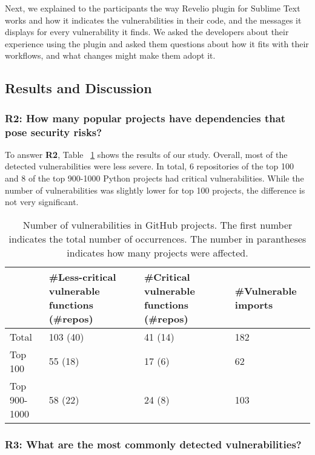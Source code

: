 Next, we explained to the participants the way Revelio plugin for Sublime Text works and how it indicates the vulnerabilities in their code, and the messages it displays for every vulnerability it finds. We asked the developers about their experience using the plugin and asked them questions about how it fits with their workflows, and what changes might make them adopt it.

\subsection{Results and Discussion}

\subsubsection{R2: How many popular projects have dependencies that pose security risks?}

To answer \textbf{R2}, Table ~\ref{tab:vuln} shows the results of our study. Overall, most of the detected vulnerabilities were less severe. In total, 6 repositories of the top 100 and 8 of the top 900-1000 Python projects had critical vulnerabilities. While the number of vulnerabilities was slightly lower for top 100 projects, the difference is not very significant.

\begin{table}[!h]
\small
  \centering
  \begin{tabular}{|p{}|p{}|p{}|p{}|}
    \hline
 & \#Less-critical vulnerable functions (\#repos)& \#Critical vulnerable functions (\#repos) & \#Vulnerable imports \\
\hline
\hline
Total & 103 (40) & 41 (14) & 182  \\
\hline
Top 100 & 55 (18) & 17 (6) & 62 \\
\hline
Top 900-1000 & 58 (22) & 24 (8) & 103  \\
 \hline
  \end{tabular}
  \caption{Number of vulnerabilities in GitHub projects. The first number indicates the total number of occurrences. The number in parantheses indicates how many projects were affected.} \label{tab:vuln}
\end{table}


\subsubsection{R3: What are the most commonly detected vulnerabilities?}




